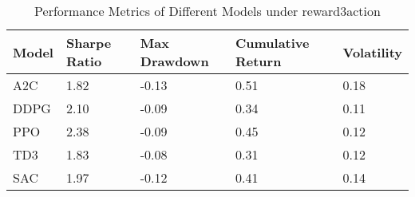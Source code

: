 \begin{table}[H]
\centering
\begin{tabular}{|l|l|l|l|l|}
\hline
Model & Sharpe Ratio & Max Drawdown & Cumulative Return & Volatility \\ \hline
A2C & 1.82 & -0.13 & 0.51 & 0.18 \\ \hline
DDPG & 2.10 & -0.09 & 0.34 & 0.11 \\ \hline
PPO & 2.38 & -0.09 & 0.45 & 0.12 \\ \hline
TD3 & 1.83 & -0.08 & 0.31 & 0.12 \\ \hline
SAC & 1.97 & -0.12 & 0.41 & 0.14 \\ \hline
\end{tabular}
\caption{Performance Metrics of Different Models under reward3action}
\label{tab:metrics}
\end{table}